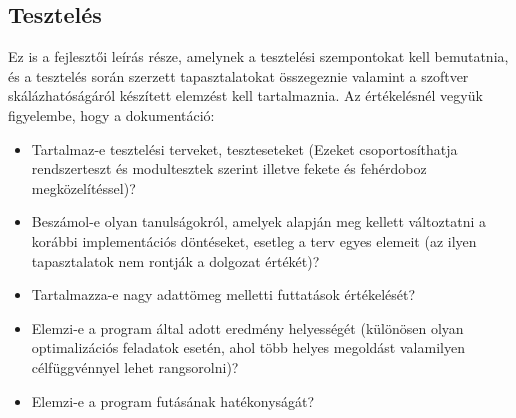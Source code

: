 \subsection{Tesztelés}
Ez is a fejlesztői leírás része, amelynek a tesztelési szempontokat kell bemutatnia, és a tesztelés során szerzett tapasztalatokat összegeznie valamint a szoftver skálázhatóságáról készített elemzést kell tartalmaznia.
    Az értékelésnél vegyük figyelembe, hogy a dokumentáció:
\begin{itemize}
    \item Tartalmaz-e tesztelési terveket, teszteseteket (Ezeket csoportosíthatja rendszerteszt és modultesztek szerint illetve fekete és fehérdoboz megközelítéssel)?
    \item Beszámol-e olyan tanulságokról, amelyek alapján meg kellett változtatni a korábbi implementációs döntéseket, esetleg a terv egyes elemeit (az ilyen tapasztalatok nem rontják a dolgozat értékét)?
    \item Tartalmazza-e nagy adattömeg melletti futtatások értékelését?
    \item Elemzi-e a program által adott eredmény helyességét (különösen olyan optimalizációs feladatok esetén, ahol több helyes megoldást valamilyen célfüggvénnyel lehet rangsorolni)?
    \item Elemzi-e a program futásának hatékonyságát?

\end{itemize}

\noindent\makebox[\linewidth]{\rule{\paperwidth}{0.4pt}}
